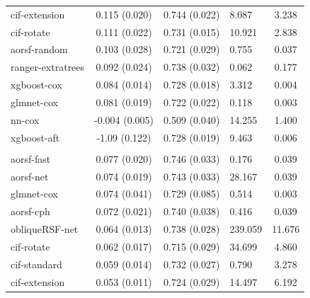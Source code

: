 \documentclass[twoside,11pt]{article}\usepackage[]{graphicx}\usepackage[]{xcolor}
\newenvironment{knitrout}{}{} %
\begin{document}
\begin{knitrout}
\begin{longtable}[t]{lcclc}
\hspace{1em}cif-extension & 0.115 (0.020) & 0.744 (0.022) & 8.087 & 3.238\\
\hspace{1em}cif-rotate & 0.111 (0.022) & 0.731 (0.015) & 10.921 & 2.838\\
\hspace{1em}aorsf-random & 0.103 (0.028) & 0.721 (0.029) & 0.755 & 0.037\\
\hspace{1em}ranger-extratrees & 0.092 (0.024) & 0.738 (0.032) & 0.062 & 0.177\\
\hspace{1em}xgboost-cox & 0.084 (0.014) & 0.728 (0.018) & 3.312 & 0.004\\
\hspace{1em}glmnet-cox & 0.081 (0.019) & 0.722 (0.022) & 0.118 & 0.003\\
\hspace{1em}nn-cox & -0.004 (0.005) & 0.509 (0.040) & 14.255 & 1.400\\
\hspace{1em}xgboost-aft & -1.09 (0.122) & 0.728 (0.019) & 9.463 & 0.006\\
\addlinespace[0.3em]
\hline
\multicolumn{5}{l}{\textit{\textbf{GUIDE-IT; CVD death, n = 894, p = 59}}}\\
\hline
\hspace{1em}aorsf-fast & 0.077 (0.020) & 0.746 (0.033) & 0.176 & 0.039\\
\hspace{1em}aorsf-net & 0.074 (0.019) & 0.743 (0.033) & 28.167 & 0.039\\
\hspace{1em}glmnet-cox & 0.074 (0.041) & 0.729 (0.085) & 0.514 & 0.003\\
\hspace{1em}aorsf-cph & 0.072 (0.021) & 0.740 (0.038) & 0.416 & 0.039\\
\hspace{1em}obliqueRSF-net & 0.064 (0.013) & 0.738 (0.028) & 239.059 & 11.676\\
\hspace{1em}cif-rotate & 0.062 (0.017) & 0.715 (0.029) & 34.699 & 4.860\\
\hspace{1em}cif-standard & 0.059 (0.014) & 0.732 (0.027) & 0.790 & 3.278\\
\hspace{1em}cif-extension & 0.053 (0.011) & 0.724 (0.029) & 14.497 & 6.192\\

\end{longtable}
\end{knitrout}
\end{document}
